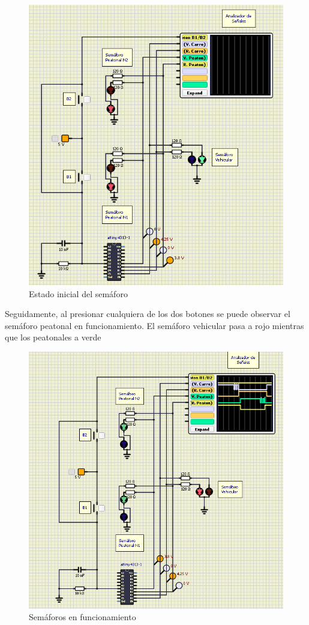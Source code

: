 \begin{figure}[H]
    \centering
    \includegraphics[scale=0.6]{images/uso1.png}
    \caption{Estado inicial del semáforo}
    \label{fig:semaforo2}
\end{figure}

Seguidamente, al presionar cualquiera de los dos botones se puede observar el semáforo peatonal en funcionamiento. El semáforo vehicular pasa a rojo mientras que los peatonales a verde


\begin{figure}[H]
    \centering
    \includegraphics[scale=0.6]{images/uso2.png}
    \caption{Semáforos en funcionamiento}
    \label{fig:semaforo2}
\end{figure}

